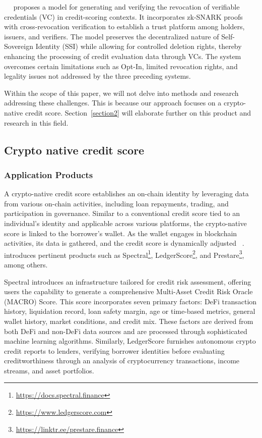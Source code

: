 \documentclass[../ICIT-Paper-2024.tex]{subfiles}
\begin{document}
~\citeauthor{cho2021verifiable}~\cite{cho2021verifiable} proposes a model for generating and verifying the revocation of verifiable credentials (VC) in credit-scoring contexts. It incorporates zk-SNARK proofs with cross-revocation verification to establish a trust platform among holders, issuers, and verifiers. The model preserves the decentralized nature of Self-Sovereign Identity (SSI) while allowing for controlled deletion rights, thereby enhancing the processing of credit evaluation data through VCs. The system overcomes certain limitations such as Opt-In, limited revocation rights, and legality issues not addressed by the three preceding systems.

Within the scope of this paper, we will not delve into methods and research addressing these challenges. This is because our approach focuses on a crypto-native credit score. Section~\ref{section2} will elaborate further on this product and research in this field.

\subsection{Crypto native credit score}
\subsubsection{Application Products}
A crypto-native credit score establishes an on-chain identity by leveraging data from various on-chain activities, including loan repayments, trading, and participation in governance. Similar to a conventional credit score tied to an individual's identity and applicable across various platforms, the crypto-native score is linked to the borrower's wallet. As the wallet engages in blockchain activities, its data is gathered, and the credit score is dynamically adjusted ~\cite{packin2023crypto}. ~\citeauthor{packin2023crypto}~\cite{packin2023crypto} introduces pertinent products such as Spectral\footnote{\href{https://docs.spectral.finance/}{https://docs.spectral.finance}}, LedgerScore\footnote{\href{https://www.ledgerscore.com/}{https://www.ledgerscore.com}}, and Prestare\footnote{\href{https://linktr.ee/prestare.finance}{https://linktr.ee/prestare.finance}}, among others.

Spectral introduces an infrastructure tailored for credit risk assessment, offering users the capability to generate a comprehensive Multi-Asset Credit Risk Oracle (MACRO) Score. This score incorporates seven primary factors: DeFi transaction history, liquidation record, loan safety margin, age or time-based metrics, general wallet history, market conditions, and credit mix. These factors are derived from both DeFi and non-DeFi data sources and are processed through sophisticated machine learning algorithms. Similarly, LedgerScore furnishes autonomous crypto credit reports to lenders, verifying borrower identities before evaluating creditworthiness through an analysis of cryptocurrency transactions, income streams, and asset portfolios.
\end{document}
